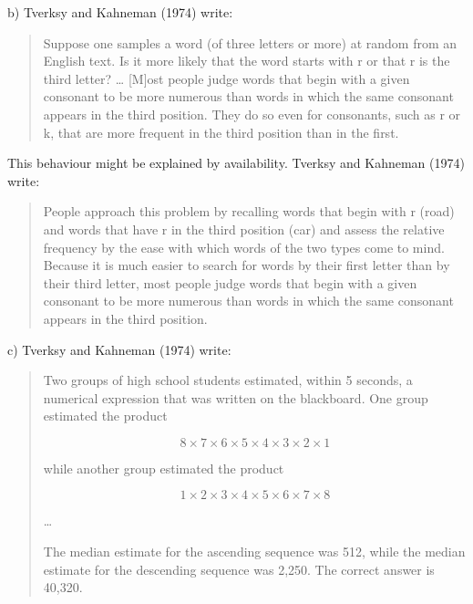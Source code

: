\documentclass[
  letterpaper,
  DIV=11,
  numbers=noendperiod]{scrreprt}
\begin{document}
b) Tverksy and Kahneman (1974) write:

\begin{quote}
Suppose one samples a word (of three letters or more) at random from an
English text. Is it more likely that the word starts with r or that r is
the third letter? \ldots{} {[}M{]}ost people judge words that begin with
a given consonant to be more numerous than words in which the same
consonant appears in the third position. They do so even for consonants,
such as r or k, that are more frequent in the third position than in the
first.
\end{quote}

\begin{tcolorbox}[enhanced jigsaw, title=\textcolor{quarto-callout-tip-color}{\faLightbulb}\hspace{0.5em}{Answer}, toprule=.15mm, colback=white, breakable, titlerule=0mm, colframe=quarto-callout-tip-color-frame, coltitle=black, opacityback=0, rightrule=.15mm, colbacktitle=quarto-callout-tip-color!10!white, bottomtitle=1mm, opacitybacktitle=0.6, arc=.35mm, bottomrule=.15mm, toptitle=1mm, leftrule=.75mm, left=2mm]

This behaviour might be explained by availability. Tverksy and Kahneman
(1974) write:

\begin{quote}
People approach this problem by recalling words that begin with r (road)
and words that have r in the third position (car) and assess the
relative frequency by the ease with which words of the two types come to
mind. Because it is much easier to search for words by their first
letter than by their third letter, most people judge words that begin
with a given consonant to be more numerous than words in which the same
consonant appears in the third position.
\end{quote}

\end{tcolorbox}

c) Tverksy and Kahneman (1974) write:

\begin{quote}
Two groups of high school students estimated, within 5 seconds, a
numerical expression that was written on the blackboard. One group
estimated the product

\[8\times 7\times 6\times 5\times 4\times 3\times 2\times 1\]

while another group estimated the product

\[1\times 2\times 3\times 4\times 5\times 6\times 7\times 8\]

\ldots{}

The median estimate for the ascending sequence was 512, while the median
estimate for the descending sequence was 2,250. The correct answer is
40,320.
\end{quote}
\end{document}
